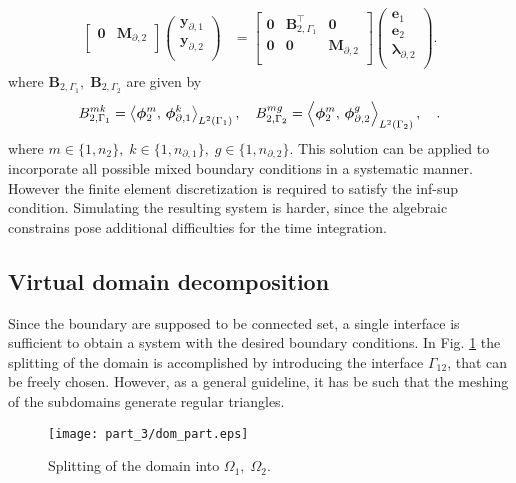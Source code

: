\begin{equation}
\begin{aligned}
\begin{bmatrix}
\mathbf{0} & \mathbf{M}_{\partial, 2} \\
\end{bmatrix}
\begin{pmatrix}
\mathbf{y}_{\partial, 1} \\
\mathbf{y}_{\partial, 2} \\
\end{pmatrix}
&= \begin{bmatrix}
\mathbf{0} & \mathbf{B}_{2, \Gamma_1}^\top & \mathbf{0} \\
\mathbf{0} & \mathbf{0} & \mathbf{M}_{\partial, 2} \\
\end{bmatrix}\begin{pmatrix}
\mathbf{e}_{1} \\
\mathbf{e}_{2} \\
{\bm{\lambda}}_{\partial, 2} \\
\end{pmatrix}.
\end{aligned}
\end{equation}
where $\mathbf{B}_{2, \Gamma_1}, \; \mathbf{B}_{2, \Gamma_2}$ are given by
\begin{equation}
{B}_{2, \Gamma_1}^{mk} = \inner[L^2(\Gamma_1)]{\bm{\phi}_{2}^m}{\bm{\phi}_{\partial, 1}^k}, \quad
{B}_{2, \Gamma_2}^{mg} = \inner[L^2(\Gamma_2)]{\bm{\phi}_{2}^m}{\bm{\phi}_{\partial, 2}^g}, 
 \quad .
\end{equation} 
where $m \in \{1,n_2\},\; k \in \{1,n_{\partial, 1}\},\; g \in \{1,n_{\partial, 2}\}$. This solution can be applied to incorporate all possible mixed boundary conditions in a systematic manner. However the finite element discretization is required to satisfy the inf-sup condition. Simulating the resulting system is harder, since the algebraic constrains pose additional difficulties for the time integration.

\subsection{Virtual domain decomposition}\label{sec:vdd}
Since the boundary are supposed to be connected set, a single interface is sufficient to obtain a system with the desired boundary conditions. In Fig. \ref{fig:dom_part} the splitting of the domain is accomplished by introducing the interface $\Gamma_{12}$, that can be freely chosen. However, as a general guideline, it has be such that the meshing of the subdomains generate regular triangles.  

\begin{figure}[tb]
	\centering
	\texttt{[image: part\_3/dom\_part.eps]}
	\caption{Splitting of the domain into $\Omega_1, \; \Omega_2$.}
	\label{fig:dom_part}
\end{figure}

